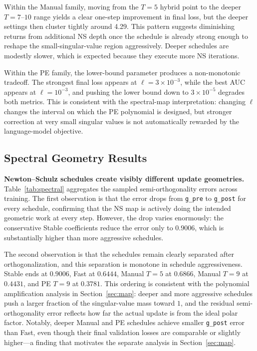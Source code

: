 \documentclass[10pt]{article}
\begin{document}
Within the Manual family, moving from the $T=5$ hybrid point to the deeper $T=7$--$10$ range yields a clear one-step improvement in final loss, but the deeper settings then cluster tightly around 4.29. This pattern suggests diminishing returns from additional NS depth once the schedule is already strong enough to reshape the small-singular-value region aggressively. Deeper schedules are modestly slower, which is expected because they execute more NS iterations. 

Within the PE family, the lower-bound parameter produces a non-monotonic tradeoff. The strongest final loss appears at $\ell=3\times10^{-3}$, while the best AUC appears at $\ell=10^{-3}$, and pushing the lower bound down to $3\times10^{-5}$ degrades both metrics. This is consistent with the spectral-map interpretation: changing $\ell$ changes the interval on which the PE polynomial is designed, but stronger correction at very small singular values is not automatically rewarded by the language-model objective.


\subsection{Spectral Geometry Results}
\textbf{Newton--Schulz schedules create visibly different update geometries.} Table~\ref{tab:spectral} aggregates the sampled semi-orthogonality errors across training. The first observation is that the error drops from \texttt{g\_pre} to \texttt{g\_post} for every schedule, confirming that the NS map is actively doing the intended geometric work at every step. However, the drop varies enormously: the conservative Stable coefficients reduce the error only to $0.9006$, which is substantially higher than more aggressive schedules.

The second observation is that the schedules remain clearly separated after orthogonalization, and this separation is monotone in schedule aggressiveness. Stable ends at $0.9006$, Fast at $0.6444$, Manual $T=5$ at $0.6866$, Manual $T=9$ at $0.4431$, and PE $T=9$ at $0.3781$. This ordering is consistent with the polynomial amplification analysis in Section~\ref{sec:map}: deeper and more aggressive schedules push a larger fraction of the singular-value mass toward $1$, and the residual semi-orthogonality error reflects how far the actual update is from the ideal polar factor. Notably, deeper Manual and PE schedules achieve smaller \texttt{g\_post} error than Fast, even though their final validation losses are comparable or slightly higher---a finding that motivates the separate analysis in Section~\ref{sec:map}.
\end{document}
